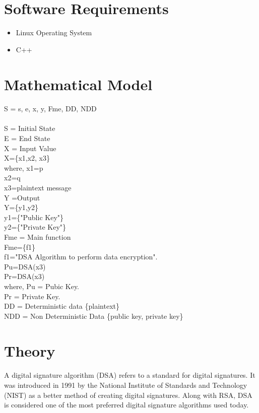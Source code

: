 \documentclass[a4paper,12pt]{article}
\begin{document}
\section{Software Requirements}
	\begin{itemize}
		\item	Linux Operating System
		\item	C++
	\end{itemize}
	
\section{Mathematical Model}
\paragraph{} 
S 	= {s, e, x, y, Fme, DD, NDD}  											\\\\
S   =   Initial State  										\\
E 	=   End State  																\\
X	= Input Value\\
X=\{x1,x2, x3\} \\
where,  x1=p\\
x2=q\\
x3=plaintext message\\
Y	=Output\\
Y=\{y1,y2\}\\
y1=\{"Public Key"\}\\
y2=\{"Private Key"\}\\
Fme 	= 	Main function \\
Fme=\{f1\}\\f1="DSA Algorithm to perform data encryption".\\
Pu=DSA(x3)\\
Pr=DSA(x3)\\
where, Pu = Pubic Key.\\
Pr = Private Key.\\
DD 	= 	Deterministic data \{plaintext\}\\
NDD	= 	Non Deterministic Data \{public key, private key\}			\\
	
		
	
\section{Theory}
	\paragraph{} A digital signature algorithm (DSA) refers to a standard for digital signatures. It was introduced in 1991 by the National Institute of Standards and Technology (NIST) as a better method of creating digital signatures. Along with RSA, DSA is considered one of the most preferred digital signature algorithms used today.
\end{document}
